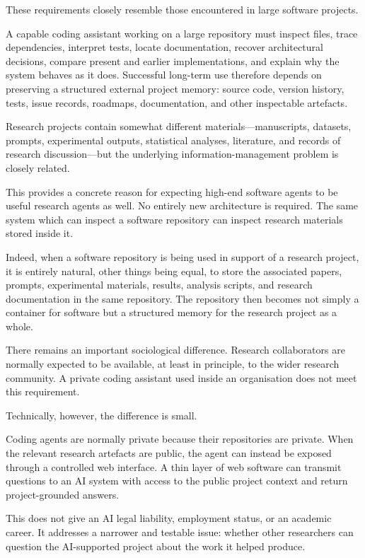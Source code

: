 These requirements closely resemble those encountered in large software projects.

A capable coding assistant working on a large repository must inspect files, trace dependencies, interpret tests, locate documentation, recover architectural decisions, compare present and earlier implementations, and explain why the system behaves as it does. Successful long-term use therefore depends on preserving a structured external project memory: source code, version history, tests, issue records, roadmaps, documentation, and other inspectable artefacts.

Research projects contain somewhat different materials---manuscripts, datasets, prompts, experimental outputs, statistical analyses, literature, and records of research discussion---but the underlying information-management problem is closely related.

This provides a concrete reason for expecting high-end software agents to be useful research agents as well. No entirely new architecture is required. The same system which can inspect a software repository can inspect research materials stored inside it.

Indeed, when a software repository is being used in support of a research project, it is entirely natural, other things being equal, to store the associated papers, prompts, experimental materials, results, analysis scripts, and research documentation in the same repository. The repository then becomes not simply a container for software but a structured memory for the research project as a whole.

There remains an important sociological difference. Research collaborators are normally expected to be available, at least in principle, to the wider research community. A private coding assistant used inside an organisation does not meet this requirement.

Technically, however, the difference is small.

Coding agents are normally private because their repositories are private. When the relevant research artefacts are public, the agent can instead be exposed through a controlled web interface. A thin layer of web software can transmit questions to an AI system with access to the public project context and return project-grounded answers.

This does not give an AI legal liability, employment status, or an academic career. It addresses a narrower and testable issue: whether other researchers can question the AI-supported project about the work it helped produce.

